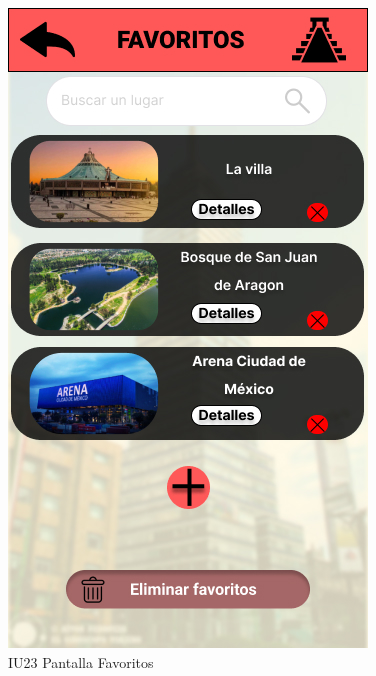 \begin{figure}[h]
    \begin{minipage}{0.5\textwidth}
        \centering
        \includegraphics[width=.7\linewidth]{Pantallas Prototipo3/IU23 Pantalla Favoritos.jpg}
        \caption{IU23 Pantalla Favoritos}
    \end{minipage}
    

\end{figure}
